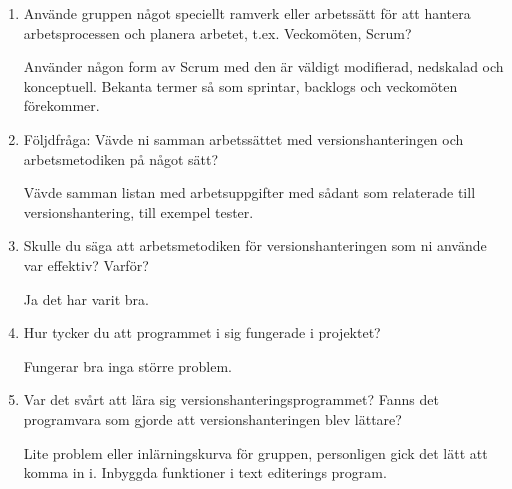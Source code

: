 \begin{enumerate}
  \item Använde gruppen något speciellt ramverk eller arbetssätt för att hantera arbetsprocessen och planera arbetet, t.ex. Veckomöten, Scrum?

  Använder någon form av Scrum med den är väldigt modifierad, nedskalad och konceptuell. Bekanta termer så som sprintar, backlogs och veckomöten förekommer.

  \item Följdfråga: Vävde ni samman arbetssättet med versionshanteringen och arbetsmetodiken på något sätt?

  Vävde samman listan med arbetsuppgifter med sådant som relaterade till versionshantering, till exempel tester.

  \item Skulle du säga att arbetsmetodiken för versionshanteringen som ni använde var effektiv? Varför?

  Ja det har varit bra.

  \item Hur tycker du att programmet i sig fungerade i projektet?

  Fungerar bra inga större problem.

  \item Var det svårt att lära sig versionshanteringsprogrammet? Fanns det programvara som gjorde att versionshanteringen blev lättare?

  Lite problem eller inlärningskurva för gruppen, personligen gick det lätt att komma in i. Inbyggda funktioner i text editerings program.

\end{enumerate}

